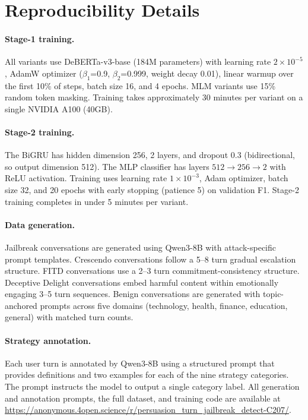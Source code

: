 \section{Reproducibility Details}
\label{sec:reproducibility}

\paragraph{Stage-1 training.}
All variants use DeBERTa-v3-base (184M parameters) with learning rate $2 \times 10^{-5}$, AdamW optimizer ($\beta_1$=0.9, $\beta_2$=0.999, weight decay 0.01), linear warmup over the first 10\% of steps, batch size 16, and 4 epochs. MLM variants use 15\% random token masking. Training takes approximately 30 minutes per variant on a single NVIDIA A100 (40GB).

\paragraph{Stage-2 training.}
The BiGRU has hidden dimension 256, 2 layers, and dropout 0.3 (bidirectional, so output dimension 512). The MLP classifier has layers $512 \to 256 \to 2$ with ReLU activation. Training uses learning rate $1 \times 10^{-3}$, Adam optimizer, batch size 32, and 20 epochs with early stopping (patience 5) on validation F1. Stage-2 training completes in under 5 minutes per variant.

\paragraph{Data generation.}
Jailbreak conversations are generated using Qwen3-8B with attack-specific prompt templates. Crescendo conversations follow a 5--8 turn gradual escalation structure. FITD conversations use a 2--3 turn commitment-consistency structure. Deceptive Delight conversations embed harmful content within emotionally engaging 3--5 turn sequences. Benign conversations are generated with topic-anchored prompts across five domains (technology, health, finance, education, general) with matched turn counts.

\paragraph{Strategy annotation.}
Each user turn is annotated by Qwen3-8B using a structured prompt that provides definitions and two examples for each of the nine strategy categories. The prompt instructs the model to output a single category label. All generation and annotation prompts, the full dataset, and training code are available at \url{https://anonymous.4open.science/r/persuasion_turn_jailbreak_detect-C207/}.

